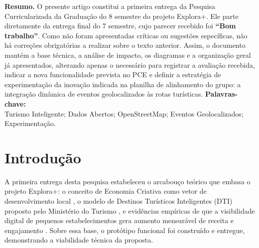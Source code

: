 \documentclass[12pt, a4paper]{article}
\begin{document}
\thispagestyle{plain}
\noindent\textbf{Resumo.} O presente artigo constitui a primeira entrega da Pesquisa Curricularizada da Gradua\c{c}\~ao do 8\textordmasculine{} semestre do projeto Explora+. Ele parte diretamente da entrega final do 7\textordmasculine{} semestre, cujo parecer recebido foi \textbf{``Bom trabalho''}. Como n\~ao foram apresentadas cr\'iticas ou sugest\~oes espec\'ificas, n\~ao h\'a corre\c{c}\~oes obrigat\'orias a realizar sobre o texto anterior. Assim, o documento mant\'em a base t\'ecnica, a an\'alise de impacto, os diagramas e a organiza\c{c}\~ao geral j\'a apresentados, alterando apenas o necess\'ario para registrar a avalia\c{c}\~ao recebida, indicar a nova funcionalidade prevista no PCE e definir a estrat\'egia de experimenta\c{c}\~ao da inova\c{c}\~ao indicada na planilha de alinhamento do grupo: a integra\c{c}\~ao din\^amica de eventos geolocalizados \`as rotas tur\'isticas.
\vspace{0.4cm}
\noindent\textbf{Palavras-chave:}\\
Turismo Inteligente; Dados Abertos; OpenStreetMap; Eventos Geolocalizados; Experimenta\c{c}\~ao.
\clearpage

\thispagestyle{plain}
\tableofcontents
\clearpage
{}
\setcounter{page}{1}

\section{Introdu\c{c}\~ao}

A primeira entrega desta pesquisa estabeleceu o arcabou\c{c}o te\'orico que embasa o projeto Explora+: o conceito de Economia Criativa como vetor de desenvolvimento local \parencite{silva2020}, o modelo de Destinos Tur\'isticos Inteligentes (DTI) proposto pelo Minist\'erio do Turismo \parencite{brasil2022}, e evid\^encias emp\'iricas de que a visibilidade digital de pequenos estabelecimentos gera aumento mensur\'avel de receita \parencite{luca2022} e engajamento \parencite{shankar2025}. Sobre essa base, o prot\'otipo funcional foi constru\'ido e entregue, demonstrando a viabilidade t\'ecnica da proposta.
\end{document}
